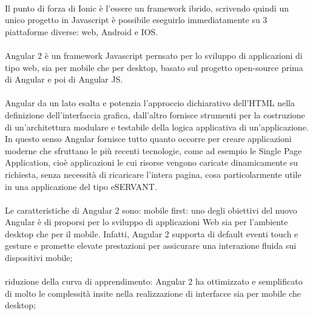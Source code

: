 \paragraph{}

Il punto di forza di Ionic è l’essere un framework ibrido, scrivendo quindi un unico progetto in Javascript è possibile eseguirlo immediatamente su 3 piattaforme diverse: web, Android e IOS.
\paragraph{}

Angular 2 è un framework Javascript pernsato per lo sviluppo di applicazioni di tipo web, sia per mobile che per desktop, basato sul progetto open-source prima di Angular e poi di Angular JS.
\paragraph{}

Angular da un lato esalta e potenzia l’approccio dichiarativo dell’HTML nella definizione
dell’interfaccia grafica, dall’altro fornisce strumenti per la costruzione di un’architettura modulare e testabile della logica applicativa di un’applicazione.
In questo senso Angular fornisce tutto quanto occorre per creare applicazioni moderne che
sfruttano le più recenti tecnologie, come ad esempio le Single Page Application, cioè
applicazioni le cui risorse vengono caricate dinamicamente su richiesta, senza necessità di
ricaricare l’intera pagina, cosa particolarmente utile in una applicazione del tipo eSERVANT.
\paragraph{}

Le caratteristiche di Angular 2 sono:
mobile first: uno degli obiettivi del nuovo Angular è di proporsi per lo
sviluppo di applicazioni Web sia per l’ambiente desktop che per il mobile.
Infatti, Angular 2 supporta di default eventi touch e gesture e promette
elevate prestazioni per assicurare una interazione fluida sui dispositivi
mobile;
\paragraph{}

riduzione della curva di apprendimento: Angular 2 ha ottimizzato e
semplificato di molto le complessità insite nella realizzazione di interfacce
sia per mobile che desktop;
\paragraph{}

